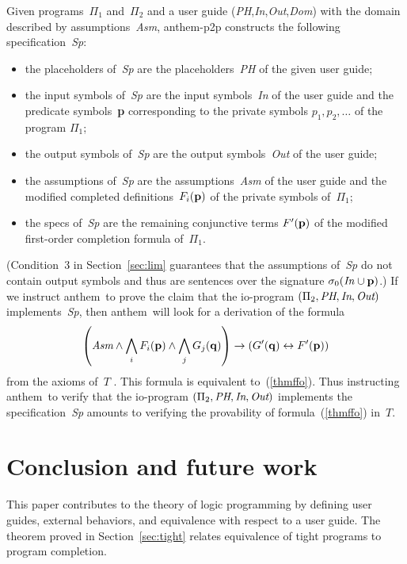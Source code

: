 \documentclass{new_tlp}
\def\lrar{\leftrightarrow}
\def\anthem{{\sc anthem}}
\begin{document}
Given programs~$\Pi_1$ and~$\Pi_2$ and a user guide
(\emph{PH},\emph{In},\emph{Out},\emph{Dom\/}) with the domain described
by assumptions~\emph{Asm}, {\sc anthem-p2p} constructs the following
specification~\emph{Sp\/}:
\begin{itemize}
\item
  the placeholders of~\emph{Sp\/} are the placeholders~\emph{PH\/} of the
  given user guide;
  \item
    the input symbols of~\emph{Sp\/} are the input symbols~\emph{In} of
    the user guide and the predicate symbols~{\bf p} corresponding to
    the private symbols $p_1,p_2,\dots$ of the program $\Pi_1$;
  \item
    the output symbols of~\emph{Sp\/} are the output symbols~\emph{Out} of
the user guide;
\item
  the assumptions of~\emph{Sp\/} are the assumptions~\emph{Asm} of the
  user guide and the modified completed definitions~$F_i({\bf p})$ of the
  private symbols of~$\Pi_1$;
\item
  the specs of~\emph{Sp\/} are the remaining conjunctive terms
  $F'({\bf p})$ of the modified first-order completion formula of~$\Pi_1$.
\end{itemize}
(Condition~3 in Section~\ref{sec:lim} guarantees that
the assumptions of~\emph{Sp\/} do not contain output symbols and thus
are sentences over the signature $\sigma_0(\emph{In\/}\cup{\bf p})$.)
If we instruct \anthem\ to prove the claim
that the io-program $(\Pi_2,\emph{PH},\emph{In},\emph{Out})$
implements~\emph{Sp\/}, then \anthem\ will look for a derivation of the formula
$$\left(
    \emph{Asm}\land\bigwedge_i F_i({\bf p})
\land\bigwedge_j G_j({\bf q}) \right) \to (G'({\bf q})\lrar F'({\bf p}))
$$
from the axioms of~$T$ \cite[Section~6.4]{fan20}.
This formula is equivalent to~(\ref{thmffo}).
Thus instructing \anthem\ to verify that
the io-program $(\Pi_2,\emph{PH},\emph{In},\emph{Out})$
implements the specification~\emph{Sp\/} amounts to verifying the provability
of formula~(\ref{thmffo}) in~$T$.

\section{Conclusion and future work}

This paper contributes to the theory of logic programming by defining user
guides, external behaviors, and equivalence with respect to a user guide.
The theorem proved in Section~\ref{sec:tight} relates equivalence of tight
programs to program completion.
\end{document}
